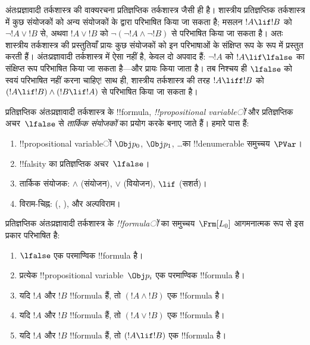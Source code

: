 \documentclass[../../../include/open-logic-section]{subfiles}
\begin{document}


अंतःप्रज्ञावादी तर्कशास्त्र की वाक्यरचना प्रतिज्ञप्तिक तर्कशास्त्र जैसी ही
है। शास्त्रीय प्रतिज्ञप्तिक तर्कशास्त्र में कुछ संयोजकों को अन्य संयोजकों के
द्वारा परिभाषित किया जा सकता है; मसलन $!A \lif !B$ को
$\lnot !A \lor !B$ से, अथवा $!A \lor !B$ को
$\lnot(\lnot !A \land \lnot !B)$ से परिभाषित किया जा सकता है। अतः
शास्त्रीय तर्कशास्त्र की प्रस्तुतियाँ प्रायः कुछ संयोजकों को इन परिभाषाओं के
संक्षिप्त रूप के रूप में प्रस्तुत करती हैं। अंतःप्रज्ञावादी तर्कशास्त्र में
ऐसा नहीं है, केवल दो अपवाद हैं: $\lnot !A$ को $!A \lif \lfalse$ का संक्षिप्त
रूप परिभाषित किया जा सकता है---और प्रायः किया जाता है। तब निश्चय ही
$\lfalse$ को स्वयं परिभाषित नहीं करना चाहिए!{} साथ ही, शास्त्रीय तर्कशास्त्र
की तरह $!A \liff !B$ को $(!A \lif !B) \land (!B \lif !A)$ से परिभाषित किया
जा सकता है।

प्रतिज्ञप्तिक अंतःप्रज्ञावादी तर्कशास्त्र के !!{formula},
\emph{!!{propositional variable}ों} और प्रतिज्ञप्तिक अचर~$\lfalse$ से
\emph{तार्किक संयोजकों} का प्रयोग करके बनाए जाते हैं। हमारे पास हैं:

\begin{enumerate}
\item !!{propositional variable}ों $\Obj p_0$, $\Obj p_1$, \dots का
  !!{denumerable} समुच्चय~$\PVar$।
\item !!{falsity} का प्रतिज्ञप्तिक अचर~$\lfalse$।
\item तार्किक संयोजक: $\land$ (संयोजन), $\lor$ (वियोजन),
  $\lif$ (सशर्त)।
\item विराम-चिह्न: (, ), और अल्पविराम।
\end{enumerate}

\begin{defn}[सूत्र]
 प्रतिज्ञप्तिक अंतःप्रज्ञावादी तर्कशास्त्र के
\emph{!!{formula}ों} का समुच्चय~$\Frm[L_0]$ आगमनात्मक रूप से इस प्रकार
परिभाषित है:
\begin{enumerate}
\item $\lfalse$ एक परमाण्विक !!{formula} है।

\item प्रत्येक !!{propositional variable}~$\Obj p_i$ एक परमाण्विक !!{formula} है।

\item यदि $!A$ और $!B$ !!{formula} हैं, तो $(!A \land !B)$ एक !!{formula} है।

\item यदि $!A$ और $!B$ !!{formula} हैं, तो $(!A \lor !B)$ एक !!{formula} है।

\item यदि $!A$ और $!B$ !!{formula} हैं, तो $(!A \lif !B)$ एक !!{formula} है।

\end{enumerate}
\end{defn}
\end{document}
